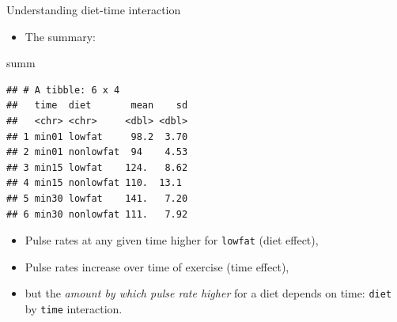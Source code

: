 \documentclass[
  ignorenonframetext,
]{beamer}
\newenvironment{Shaded}{\begin{snugshade}}{\end{snugshade}}
\newcommand{\NormalTok}[1]{#1}
\providecommand{\tightlist}{%
  \setlength{\itemsep}{0pt}\setlength{\parskip}{0pt}}
\begin{document}
\begin{frame}[fragile]{Understanding diet-time interaction}
\protect\hypertarget{understanding-diet-time-interaction}{}

\begin{itemize}
\tightlist
\item
  The summary:
\end{itemize}

\footnotesize

\begin{Shaded}
\begin{Highlighting}[]
\NormalTok{summ}
\end{Highlighting}
\end{Shaded}

\begin{verbatim}
## # A tibble: 6 x 4
##   time  diet       mean    sd
##   <chr> <chr>     <dbl> <dbl>
## 1 min01 lowfat     98.2  3.70
## 2 min01 nonlowfat  94    4.53
## 3 min15 lowfat    124.   8.62
## 4 min15 nonlowfat 110.  13.1 
## 5 min30 lowfat    141.   7.20
## 6 min30 nonlowfat 111.   7.92
\end{verbatim}

\normalsize

\begin{itemize}
\item
  Pulse rates at any given time higher for \texttt{lowfat} (diet
  effect),
\item
  Pulse rates increase over time of exercise (time effect),
\item
  but the \emph{amount by which pulse rate higher} for a diet depends on
  time: \texttt{diet} by \texttt{time} interaction.
\end{itemize}

\end{frame}
\end{document}
